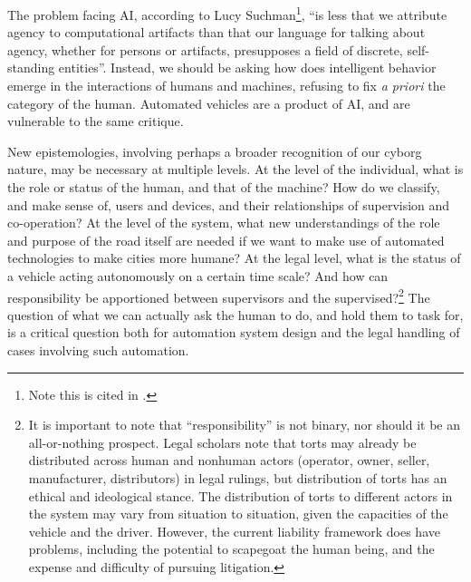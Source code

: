 

The problem facing AI, according to Lucy Suchman\footnote{Note this is cited in
  \cite[p. 331-332]{ekbia}.}, ``is less that we attribute agency to
computational artifacts than that our language for talking about
agency, whether for persons or artifacts, presupposes a field of
discrete, self-standing entities''\cite[p.
  263]{???-suchman-humanmachinereconfigurations-plansandsituatedactions-2e}.
Instead, we should be asking how does intelligent behavior emerge in
the interactions of 
humans and machines, refusing to fix \emph{a priori} the category of
the human. Automated vehicles are a product of AI, and are vulnerable
to the same critique. 

New epistemologies, involving perhaps a broader recognition of our
cyborg nature,  may be
necessary at multiple levels. At the level of the individual, what is
the role or status of the human, and that of the machine? How do we
classify, and make sense of, users and devices, and their
relationships of supervision and co-operation? At the level of the
system, what new understandings of the role and purpose of the road
itself are needed if we want to make use of automated technologies to
make cities more humane? At the legal level, what is the status of a
vehicle acting autonomously on a certain time scale? And how can
responsibility be apportioned between supervisors and the
supervised?\footnote{It is important to note that ``responsibility''
  is not binary, nor 
should it be an all-or-nothing prospect. Legal scholars note that
torts may already be distributed across human and nonhuman actors
(operator, owner, seller, manufacturer, distributors) in legal
rulings, but distribution of torts has an ethical
and ideological stance\cite{???-suemycar,etc}. The distribution of
torts to different actors in the system may vary from situation to
situation, given the capacities of 
the vehicle and the driver\cite{???-disableddriverexample}. However,
the current liability framework does have problems, including the
potential to scapegoat the human being, and the expense and difficulty
of pursuing litigation.}
The question of what we can actually ask the human to do, and hold them to task
for, is a critical question both for automation system design and the
legal handling of cases involving such automation.

